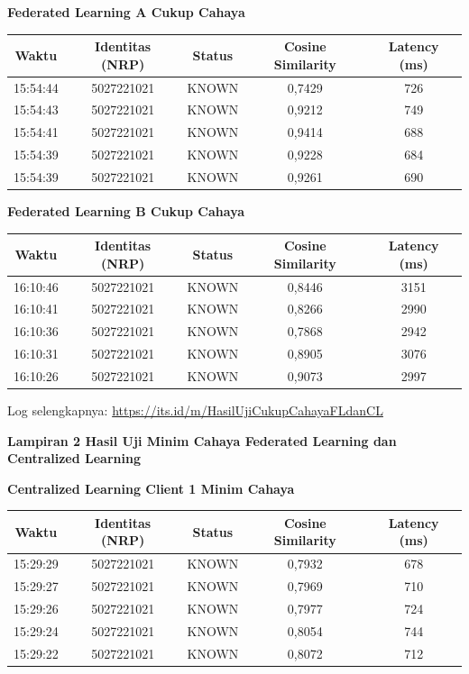 \noindent\textbf{Federated Learning A Cukup Cahaya}
\begin{center}
  \small
  \begin{tabular}{|c|c|c|c|c|}
    \hline
    \textbf{Waktu} & \textbf{Identitas (NRP)} & \textbf{Status} & \textbf{Cosine Similarity} & \textbf{Latency (ms)} \\
    \hline
    15:54:44 & 5027221021 & KNOWN & 0,7429 & 726 \\
    15:54:43 & 5027221021 & KNOWN & 0,9212 & 749 \\
    15:54:41 & 5027221021 & KNOWN & 0,9414 & 688 \\
    15:54:39 & 5027221021 & KNOWN & 0,9228 & 684 \\
    15:54:39 & 5027221021 & KNOWN & 0,9261 & 690 \\
    \hline
  \end{tabular}
\end{center}

\noindent\textbf{Federated Learning B Cukup Cahaya}
\begin{center}
  \small
  \begin{tabular}{|c|c|c|c|c|}
    \hline
    \textbf{Waktu} & \textbf{Identitas (NRP)} & \textbf{Status} & \textbf{Cosine Similarity} & \textbf{Latency (ms)} \\
    \hline
    16:10:46 & 5027221021 & KNOWN & 0,8446 & 3151 \\
    16:10:41 & 5027221021 & KNOWN & 0,8266 & 2990 \\
    16:10:36 & 5027221021 & KNOWN & 0,7868 & 2942 \\
    16:10:31 & 5027221021 & KNOWN & 0,8905 & 3076 \\
    16:10:26 & 5027221021 & KNOWN & 0,9073 & 2997 \\
    \hline
  \end{tabular}
\end{center}

\noindent Log selengkapnya: \url{https://its.id/m/HasilUjiCukupCahayaFLdanCL}

\clearpage
\noindent\textbf{Lampiran 2 Hasil Uji Minim Cahaya Federated Learning dan Centralized Learning}
\label{lampiran:2}

\vspace{2ex}

\noindent\textbf{Centralized Learning Client 1 Minim Cahaya}
\begin{center}
  \small
  \begin{tabular}{|c|c|c|c|c|}
    \hline
    \textbf{Waktu} & \textbf{Identitas (NRP)} & \textbf{Status} & \textbf{Cosine Similarity} & \textbf{Latency (ms)} \\
    \hline
    15:29:29 & 5027221021 & KNOWN & 0,7932 & 678 \\
    15:29:27 & 5027221021 & KNOWN & 0,7969 & 710 \\
    15:29:26 & 5027221021 & KNOWN & 0,7977 & 724 \\
    15:29:24 & 5027221021 & KNOWN & 0,8054 & 744 \\
    15:29:22 & 5027221021 & KNOWN & 0,8072 & 712 \\
    \hline
  \end{tabular}
\end{center}

